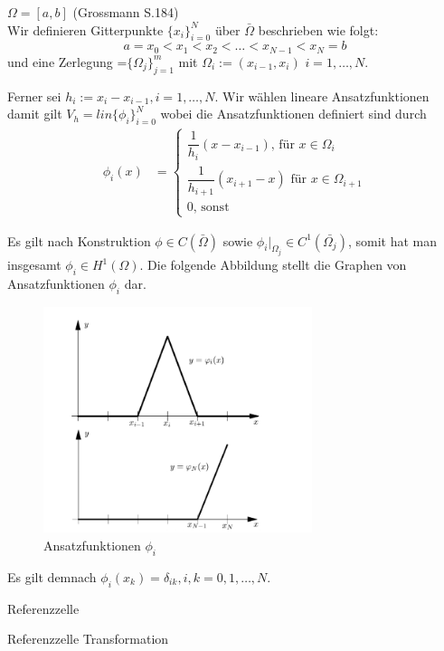 \begin{Beispiel} $\Omega = [a,b]$ (Grossmann S.184) \\
Wir definieren Gitterpunkte $\{x_i\}_{i=0}^{N}$ über $\bar\Omega$  beschrieben wie folgt:
\begin{equation*}
a = x_0 < x_1 < x_2 < \dots < x_{N-1} < x_N = b
\end{equation*}
und eine Zerlegung  {}=$\{ \Omega_j \}_{j=1}^{m}$ mit $\Omega_i := (x_{i-1},x_i)$ $i=1,\dots,N$. 
\end{Beispiel}
Ferner sei $h_i := x_i - x_{i-1}, i=1,\dots,N$. Wir wählen lineare Ansatzfunktionen damit gilt $V_h=lin\{\phi_i\}_{i=0}^{N}$ wobei die Ansatzfunktionen definiert sind durch
\begin{equation}
\begin{aligned}
\phi_i(x) &= 
\begin{cases}
\dfrac{1}{h_i}(x-x_{i-1}) \text{, für } x \in \Omega_i \\
\dfrac{1}{h_{i+1}}(x_{i+1}-x) \text{ für } x \in \Omega_{i+1}  \\
0 \text{, sonst }
\end{cases}
\end{aligned}
\end{equation}

Es gilt nach Konstruktion $\phi \in C(\bar{\Omega})$ sowie $\phi_{i} \Big|_{\Omega_{j}} \in C^{1}(\bar{\Omega_{j}})$, somit hat man insgesamt $\phi_i \in H^{1}(\Omega)$.
Die folgende Abbildung stellt die Graphen von Ansatzfunktionen $\phi_i$ dar.

\begin{figure}[ht]
	\centering
  \includegraphics[width=0.7\textwidth]{hatfunction.png}
	\caption{Ansatzfunktionen $\phi_i$}
	\label{fig:hat}
\end{figure}

Es gilt demnach $\phi_i (x_k) = \delta_{ik}, i,k =0,1,\dots,N$.

\begin{Bemerkung} Referenzzelle

\end{Bemerkung}

\begin{Satz} Referenzzelle Transformation

\end{Satz}
